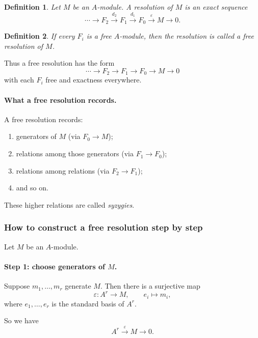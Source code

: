 \documentclass[12pt,a4paper]{article}
\theoremstyle{notespace}
\newtheorem{definition}{Definition}[section]
\begin{document}
\begin{definition}
	Let \(M\) be an \(A\)-module. A \emph{resolution} of \(M\) is an exact sequence
	\[
	\cdots \longrightarrow F_2 \xrightarrow{d_2} F_1 \xrightarrow{d_1} F_0 \xrightarrow{\varepsilon} M \longrightarrow 0.
	\]
\end{definition}

\begin{definition}
	If every \(F_i\) is a free \(A\)-module, then the resolution is called a \emph{free resolution} of \(M\).
\end{definition}

Thus a free resolution has the form
\[
\cdots \longrightarrow F_2 \longrightarrow F_1 \longrightarrow F_0 \longrightarrow M \longrightarrow 0
\]
with each \(F_i\) free and exactness everywhere.

\paragraph{What a free resolution records.}

A free resolution records:
\begin{enumerate}[leftmargin=2em]
	\item generators of \(M\) (via \(F_0\to M\));
	\item relations among those generators (via \(F_1\to F_0\));
	\item relations among relations (via \(F_2\to F_1\));
	\item and so on.
\end{enumerate}

These higher relations are called \emph{syzygies}.

\subsubsection{How to construct a free resolution step by step}

Let \(M\) be an \(A\)-module.

\paragraph{Step 1: choose generators of \(M\).}

Suppose \(m_1,\dots,m_r\) generate \(M\). Then there is a surjective map
\[
\varepsilon:A^r\to M,\qquad e_i\mapsto m_i,
\]
where \(e_1,\dots,e_r\) is the standard basis of \(A^r\).

So we have
\[
A^r \xrightarrow{\varepsilon} M \to 0.
\]
\end{document}
